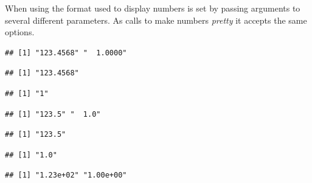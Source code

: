 \documentclass[krantz2]{krantz}\usepackage{knitr}%
\begin{document}
When using  the format used to display numbers is set by passing arguments to several different parameters. As  calls  to make numbers \emph{pretty} it accepts the same options.

\begin{knitrout}\footnotesize
{}\color{fgcolor}\begin{kframe}
\begin{alltt}
 \hlkwb{=} \hlstd{(}\hlstd{,} \hlstd{)}
 
\end{alltt}
\begin{verbatim}
## [1] "123.4568" "  1.0000"
\end{verbatim}
\begin{alltt}
\hlstd{(x[}\hlstd{])} 
\end{alltt}
\begin{verbatim}
## [1] "123.4568"
\end{verbatim}
\begin{alltt}
\hlstd{(x[}\hlstd{])} 
\end{alltt}
\begin{verbatim}
## [1] "1"
\end{verbatim}
\begin{alltt}
  \hlstd{=} \hlstd{,}  \hlstd{=} \hlstd{)}
\end{alltt}
\begin{verbatim}
## [1] "123.5" "  1.0"
\end{verbatim}
\begin{alltt}
\hlstd{(x[}\hlstd{],}  \hlstd{=} \hlstd{,}  \hlstd{=} \hlstd{)}
\end{alltt}
\begin{verbatim}
## [1] "123.5"
\end{verbatim}
\begin{alltt}
\hlstd{(x[}\hlstd{],}  \hlstd{=} \hlstd{,}  \hlstd{=} \hlstd{)}
\end{alltt}
\begin{verbatim}
## [1] "1.0"
\end{verbatim}
\begin{alltt}
  \hlstd{=} \hlstd{,}  \hlstd{=} \hlstd{)}
\end{alltt}
\begin{verbatim}
## [1] "1.23e+02" "1.00e+00"
\end{verbatim}
\end{kframe}
\end{knitrout}
\end{document}
